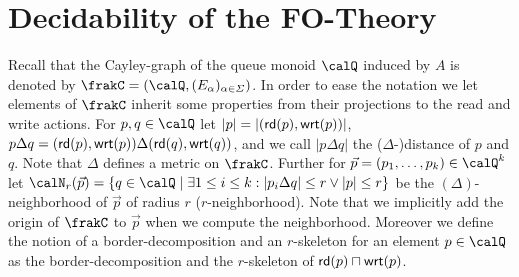 \section{Decidability of the FO-Theory}\label{sec:decidability}
Recall that the Cayley-graph of the queue monoid $\Qx$ induced by $A$ is denoted by $\frakC=(\Qx,(E_\alpha)_{\alpha\in\Sigma})$.
In order to ease the notation we let elements of $\frakC$ inherit some properties from their projections to the read and write actions. 
For $p,q\in \Qx$ let $|p| = |(\mathsf{rd}(p), \mathsf{wrt}(p))|$, $p\Delta q = (\mathsf{rd}(p), \mathsf{wrt}(p))\Delta (\mathsf{rd}(q), \mathsf{wrt}(q))$, and we call $|p\Delta q|$ the ($\Delta$-)distance of $p$ and $q$. Note that $\Delta$ defines a metric on $\frakC$. Further for $\vec{p} = (p_1,\ldots,p_k)\in \Qx^k$ let 
$\calN_r(\vec{p}) = \{ q\in \Qx \mid \exists 1\leq i \leq k: |p_i\Delta q| \leq  r  \vee  |p| \leq r \}$ be the $(\Delta)$-neighborhood of $\vec{p}$ of radius $r$ ($r$-neighborhood). Note that we implicitly add the origin
of $\frakC$ to $\vec{p}$ when we compute the neighborhood. Moreover we define the notion of a border-decomposition and an $r$-skeleton for an element $p\in\Qx$ as the border-decomposition and the $r$-skeleton of $\mathsf{rd}(p) \sqcap \mathsf{wrt}(p)$.

